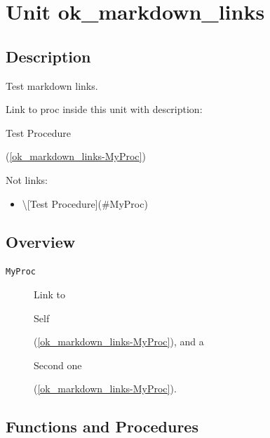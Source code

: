 \documentclass{report}
\begin{document}
\newlength{\tmplength}
\chapter{Unit ok{\_}markdown{\_}links}
\section{Description}
Test markdown links.\hfill\vspace*{1ex}



Link to proc inside this unit with description: \begin{ttfamily}Test Procedure\end{ttfamily}(\ref{ok_markdown_links-MyProc})

Not links:

\begin{itemize}
\item {\textbackslash}[Test Procedure]({\#}MyProc)
\end{itemize}
\section{Overview}
\begin{description}
\item[\texttt{MyProc}]Link to \begin{ttfamily}Self\end{ttfamily}(\ref{ok_markdown_links-MyProc}), and a \begin{ttfamily}Second one\end{ttfamily}(\ref{ok_markdown_links-MyProc}).
\end{description}
\section{Functions and Procedures}
\end{document}

